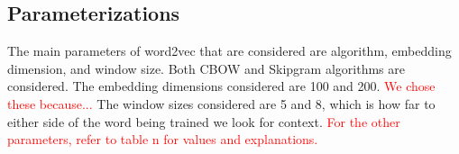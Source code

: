 \subsection{Parameterizations}

The main parameters of word2vec that are considered are algorithm, embedding dimension, and window size. Both CBOW and Skipgram algorithms are considered. The embedding dimensions considered are 100 and 200. \textcolor{red}{We chose these because...} The window sizes considered are 5 and 8, which is how far to either side of the word being trained we look for context. \textcolor{red}{For the other parameters, refer to table n for values and explanations.}
